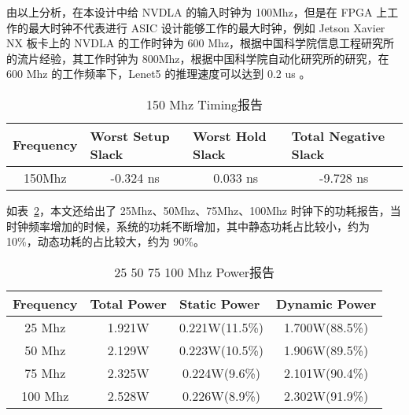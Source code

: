 由以上分析，在本设计中给 NVDLA 的输入时钟为 100Mhz，但是在 FPGA 上工作的最大时钟不代表进行 ASIC 设计能够工作的最大时钟，例如 Jetson Xavier NX 板卡上的 NVDLA 的工作时钟为 600 Mhz，根据中国科学院信息工程研究所的流片经验，其工作时钟为 800Mhz，根据中国科学院自动化研究所的研究，在 600 Mhz 的工作频率下，Lenet5 的推理速度可以达到 0.2 us \cite{9040769}。

\begin{table}[!htbp]
    \caption{150 Mhz Timing报告}
    \label{tab:150 Mhz Timing}
    \centering
    \footnotesize%
    \setlength{\tabcolsep}{4pt}%
    \renewcommand{\arraystretch}{1.2}%
    \begin{tabular}{llll}
        \toprule
        \textbf{Frequency}         & \textbf{Worst Setup Slack}    & \textbf{Worst Hold Slack}    & \textbf{Total Negative Slack} \\
        \midrule
        \multicolumn{1}{c}{150Mhz} & \multicolumn{1}{c}{-0.324 ns} & \multicolumn{1}{c}{0.033 ns} & \multicolumn{1}{c}{-9.728 ns} \\
        \bottomrule                   
    \end{tabular}
\end{table}

如表~\ref{tab:25-100 Mhz Power}，本文还给出了 25Mhz、50Mhz、75Mhz、100Mhz 时钟下的功耗报告，当时钟频率增加的时候，系统的功耗不断增加，其中静态功耗占比较小，约为 10\%，动态功耗的占比较大，约为 90\%。

\begin{table}[!htbp]
    \caption{25 50 75 100 Mhz Power报告}
    \label{tab:25-100 Mhz Power}
    \centering
    \footnotesize%
    \setlength{\tabcolsep}{4pt}%
    \renewcommand{\arraystretch}{1.2}%
    \begin{tabular}{cccc}
        \toprule
        \multicolumn{1}{l}{\textbf{Frequency}} & \multicolumn{1}{l}{\textbf{Total Power}} & \multicolumn{1}{l}{\textbf{Static Power}} & \multicolumn{1}{l}{\textbf{Dynamic Power}} \\
        \midrule
        25 Mhz                                 & 1.921W                                   & 0.221W(11.5\%)                            & 1.700W(88.5\%)                             \\
        50 Mhz                                 & 2.129W                                   & 0.223W(10.5\%)                            & 1.906W(89.5\%)                             \\
        75 Mhz                                 & 2.325W                                   & 0.224W(9.6\%)                             & 2.101W(90.4\%)                             \\
        100 Mhz                                & 2.528W                                   & 0.226W(8.9\%)                             & 2.302W(91.9\%)                             \\
        \bottomrule                   
    \end{tabular}
\end{table}


